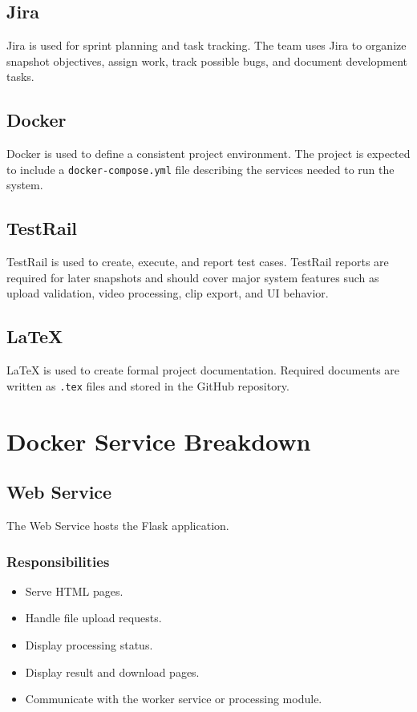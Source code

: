 \documentclass[12pt]{article}
\begin{document}
\subsection{Jira}
Jira is used for sprint planning and task tracking. The team uses Jira to organize snapshot objectives, assign work, track possible bugs, and document development tasks.

\subsection{Docker}
Docker is used to define a consistent project environment. The project is expected to include a \texttt{docker-compose.yml} file describing the services needed to run the system.

\subsection{TestRail}
TestRail is used to create, execute, and report test cases. TestRail reports are required for later snapshots and should cover major system features such as upload validation, video processing, clip export, and UI behavior.

\subsection{LaTeX}
LaTeX is used to create formal project documentation. Required documents are written as \texttt{.tex} files and stored in the GitHub repository.

\newpage

\section{Docker Service Breakdown}

\subsection{Web Service}
The Web Service hosts the Flask application.

\subsubsection*{Responsibilities}
\begin{itemize}[noitemsep]
    \item Serve HTML pages.
    \item Handle file upload requests.
    \item Display processing status.
    \item Display result and download pages.
    \item Communicate with the worker service or processing module.
\end{itemize}
\end{document}
